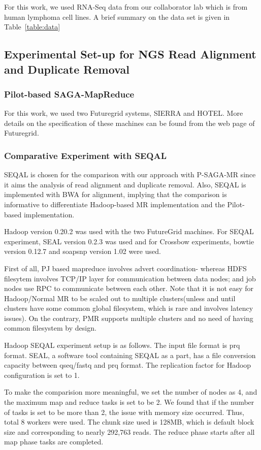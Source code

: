 \documentclass{sig-alternate}
\begin{document}
For this work, we used RNA-Seq data from our collaborator lab which is from human lymphoma cell lines.  A brief summary on the data set is given in Table~\ref{table:data}

\subsection{Experimental Set-up for NGS Read Alignment and Duplicate Removal}
\subsubsection{Pilot-based SAGA-MapReduce}
For this work, we used two Futuregrid systems, SIERRA and HOTEL.  More details on the specification of these machines can be found from the web page of Futuregrid\cite{futuregrid_url}.  


\subsubsection{Comparative Experiment with SEQAL}
SEQAL is chosen for the comparison with our approach with P-SAGA-MR since it aims the analysis of read alignment and duplicate removal.  Also, SEQAL is implemented with BWA for alignment, implying that the comparison is informative to differentiate Hadoop-based MR implementation and the Pilot-based implementation.

Hadoop version 0.20.2 was used with the two FutureGrid machines.  For SEQAL experiment, SEAL version 0.2.3 was used and for Crossbow experiments, bowtie version 0.12.7 and soapsnp version 1.02 were used.

First of all, PJ based mapreduce involves advert coordination- whereas HDFS filesytem involves TCP/IP layer for communication between data nodes; and job nodes use RPC to communicate between each other.
Note that it is not easy for Hadoop/Normal MR to be scaled out to multiple clusters(unless and until clusters have some common global filesystem, which is rare and involves latency issues).  On the contrary, PMR supports  multiple clusters and no need of having common filesystem by design.

Hadoop SEQAL experiment setup is as follows.  The input file format is prq format.  SEAL, a software tool containing SEQAL as a part, has a file conversion capacity between qseq/fastq and prq format.  The replication factor for Hadoop configuration is set  to 1.

To make the comparision more meaningful, we set the number of nodes as 4, and the maximum map and reduce tasks is set to be 2.  We found that if the number of tasks is set to be more than 2, the issue with memory size occurred.    Thus, total 8 workers were used.
The chunk size used is 128MB, which is default block size and corresponding to nearly 292,763 reads.
The reduce phase starts after all map phase tasks are completed. 
\end{document}

